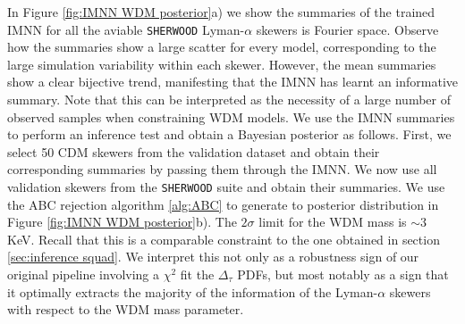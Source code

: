 In Figure \ref{fig:IMNN WDM posterior}a) we show the summaries of the trained IMNN for all the aviable \texttt{SHERWOOD} Lyman-$\alpha$ skewers is Fourier space. Observe how the summaries show a large scatter for every model, corresponding to the large simulation variability within each skewer. However, the mean summaries show a clear bijective trend, manifesting that the IMNN has learnt an informative summary. Note that this can be interpreted as the necessity of a large number of observed samples when constraining WDM models.
We use the IMNN summaries to perform an inference test and obtain a Bayesian posterior as follows. First, we select 50 CDM skewers from the validation dataset and obtain their corresponding summaries by passing them through the IMNN. We now use all validation skewers from the \texttt{SHERWOOD} suite and obtain their summaries. We use the ABC rejection algorithm \ref{alg:ABC} to generate to posterior distribution in Figure \ref{fig:IMNN WDM posterior}b). The $2\sigma$ limit for the WDM mass is $\sim 3$ KeV. Recall that this is a comparable constraint to the one obtained in section \ref{sec:inference squad}. We interpret this not only as a robustness sign of our original pipeline involving a $\chi^2$ fit the $\Delta_\tau$ PDFs, but most notably as a sign that it optimally extracts the majority of the information of the Lyman-$\alpha$ skewers with respect to the WDM mass parameter.


























